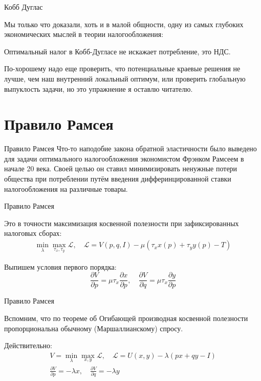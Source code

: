 \documentclass{beamer}
\begin{document}
\begin{frame}{Кобб Дуглас}

Мы только что доказали, хоть и в малой общности, одну из самых глубоких экономических мыслей в теории налогообложения:

\begin{lemma}
Оптимальный налог в Кобб-Дугласе не искажает потребление, это НДС.
\end{lemma}

По-хорошему надо еще проверить, что потенциальные краевые решения не лучше, чем наш внутренний локальный оптимум, или проверить глобальную выпуклость задачи, но это упражнение я оставлю читателю.

\end{frame}

\section{Правило Рамсея}

\begin{frame}{Правило Рамсея}
Что-то наподобие закона обратной эластичности было выведено для задачи оптимального налогообложения экономистом Фрэнком Рамсеем в начале 20 века. Своей целью он ставил минимизировать ненужные потери общества при потреблении путём введения дифферинцированной ставки налогообложения на различные товары. 
\end{frame}

\begin{frame}{Правило Рамсея}

Это в точности максимизация косвенной полезности при зафиксированных налоговых сборах:
\begin{gather*}
\min_{\lambda} \max_{\tau_x, \tau_y} \mathcal{L}, \quad \mathcal{L} = V(p,q,I) - \mu (\tau_x x(p) + \tau_y y(p) - T)
\end{gather*}

Выпишем условия первого порядка:
$$\frac{\partial V}{\partial p} = \mu \tau_x \frac{\partial x}{\partial p}, \quad \frac{\partial V}{\partial q} = \mu \tau_x \frac{\partial y}{\partial p}$$

\end{frame}

\begin{frame}{Правило Рамсея}

Вспомним, что по теореме об Огибающей производная косвенной полезности пропорциональна обычному (Маршаллианскому) спросу. 

Действительно:
\begin{gather*}
V = \min_{\lambda} \max_{x,y} \mathcal{L}, \quad \mathcal{L} = U(x, y) - \lambda (p x + q y - I) \\
\frac{\partial V}{\partial p} = - \lambda x, \quad \frac{\partial V}{\partial q} = - \lambda y
\end{gather*}

\end{frame}
\end{document}
